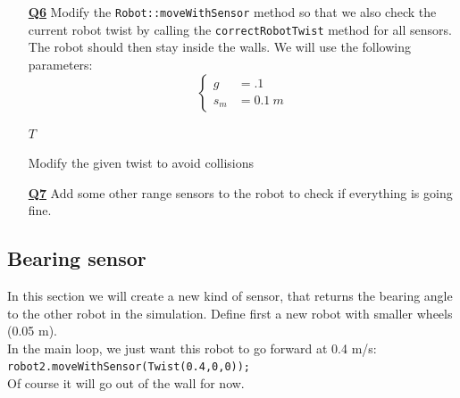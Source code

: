\documentclass{ecnreport}
\begin{document}
\begin{itemize}
\medskip\item[\textbf{\underline{Q6}}] Modify the \texttt{Robot::moveWithSensor} method so that we also check the current robot twist by calling the \texttt{correctRobotTwist} method for all sensors. The robot should then stay inside the walls. We will use the following parameters:
\begin{equation*}
\left\{\begin{array}{ll}
g &= .1 \\
s_m &= 0.1~ m
\end{array}\right.
\end{equation*}

\begin{algorithm}[!h]
{}
\Return $T$
\caption{Modify the given twist to avoid collisions}
\label{algo:range}
\end{algorithm}
\medskip\item[\textbf{\underline{Q7}}] Add some other range sensors to the robot to check if everything is going fine.
\end{itemize}



\newpage

\subsection{Bearing sensor}

In this section we will create a new kind of sensor, that returns the bearing angle to the other robot in the simulation.
Define first a new robot with smaller wheels (0.05 m). \\
In the main loop, we just want this robot to go forward at 0.4 m/s: \\\texttt{robot2.moveWithSensor(Twist(0.4,0,0));}\\
Of course it will go out of the wall for now.
\end{document}
